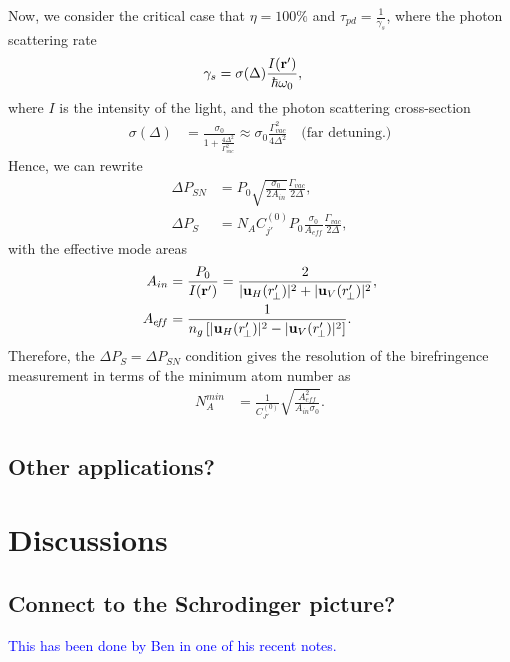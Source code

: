 \documentclass[preprint,aps,pra,onecolumn]{revtex4-1} %
\begin{document}
Now, we consider the critical case that $\eta =100\%$ and $\tau_{pd} = \frac{1}{\gamma_s}$, where the photon scattering rate
\begin{align}
\gamma_s &= \sigma(\Delta) \frac{I(\mathbf{r}')}{\hbar \omega_0}, 
\end{align}
where $ I $ is the intensity of the light, and the photon scattering cross-section
\begin{align}
\sigma(\Delta) &=\frac{\sigma_0}{1+\frac{4\Delta^2}{\Gamma^2_{vac}}}\approx \sigma_0 \frac{\Gamma_{vac}^2}{4\Delta^2} \quad \text{(far detuning.)}
\end{align}
Hence, we can rewrite 
\begin{align}
\Delta P_{SN} &=P_0\sqrt{\frac{ \sigma_0 }{2A_{in}}}\frac{\Gamma_{vac}}{2\Delta},\\
\Delta P_S &= N_A C_{j'}^{(0)}P_0 \frac{\sigma_0}{A_{e\!f\!f}}\frac{\Gamma_{vac}}{2\Delta}, 
\end{align}
with the effective mode areas
\begin{align}
A_{in } &= \frac{P_0}{I(\mathbf{r}')}=\frac{2}{| \mathbf{u}_H(r'_{\!\perp})|^2+ | \mathbf{u}_V(r'_{\!\perp})|^2},\\
A_{e\!f\!f} &= \frac{1}{n_g\left[ | \mathbf{u}_H(r'_{\!\perp})|^2- | \mathbf{u}_V(r'_{\!\perp})|^2\right]}.
\end{align}
Therefore, the $ \Delta P_S = \Delta P_{SN}$ condition gives the resolution of the birefringence measurement in terms of the minimum atom number as
\begin{align}
N^{min}_A &= \frac{1}{C_{J'}^{(0)}}\sqrt{\frac{A_{e\!f\!f}^2}{A_{in}\sigma_0}}.
\end{align}


\subsection{Other applications?} 


\section{Discussions}



\subsection{Connect to the Schrodinger picture?}
\textcolor{blue}{This has been done by Ben in one of his recent notes. }
\end{document}
